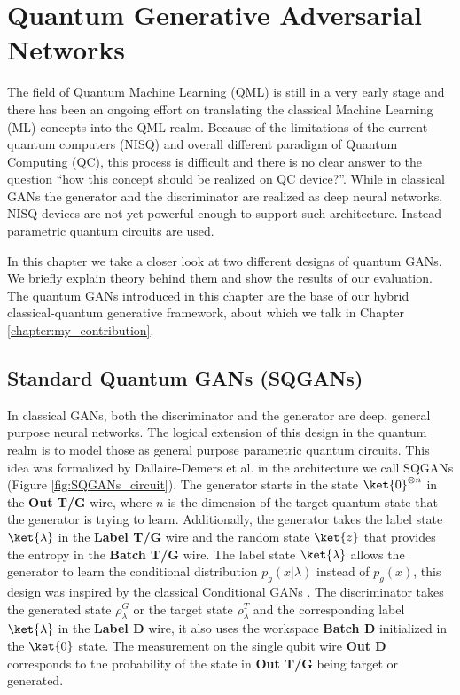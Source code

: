 \chapter{Quantum Generative Adversarial Networks}\label{chapter:quantum_gans}
The field of Quantum Machine Learning (QML) is still in a very early stage and there
has been an ongoing effort on translating the classical Machine Learning (ML)
concepts into the QML realm. Because of the limitations of the current quantum computers
(NISQ) \cite{bharti2021noisy} and overall different paradigm of Quantum
Computing (QC), this process is difficult and there is no clear
answer to the question ``how this concept should be realized on QC device?''.
While in classical GANs the generator and the discriminator are realized as deep neural
networks, NISQ devices are not yet powerful enough to support such architecture.
Instead parametric quantum circuits \cite{Schuld_2020} are used.

In this chapter we take a closer look at two different designs of quantum GANs.
We briefly explain theory behind them and show the results of our evaluation.
The quantum GANs introduced in this chapter are the base of our hybrid
classical-quantum generative framework, about which we talk in Chapter \ref{chapter:my_contribution}.

\section{Standard Quantum GANs (SQGANs)}
In classical GANs, both the discriminator and the generator are deep, general
purpose neural networks. The logical extension of this design in the quantum
realm is to model those as general purpose parametric quantum circuits. This
idea was formalized by Dallaire-Demers et al. \cite{Dallaire_Demers_2018} in
the architecture we call SQGANs (Figure \ref{fig:SQGANs_circuit}). The generator
starts in the state $\ket{0}^{\otimes n}$ in the \textbf{Out T/G} wire, where
$n$ is the dimension of the target quantum state that the generator is trying to learn.
Additionally, the generator takes the label state $\ket{\lambda}$ in the
\textbf{Label T/G} wire and the random state $\ket{z}$ that provides the entropy in
the \textbf{Batch T/G} wire. The label state $\ket{\lambda}$ allows the
generator to learn the conditional distribution $p_g(x|\lambda)$ instead of $p_g(x)$,
this design was inspired by the classical Conditional GANs
\cite{mirza2014conditional}. The discriminator takes the generated state
$\rho_\lambda^G$ or the target state $\rho_\lambda^T$ and the corresponding label
$\ket{\lambda}$ in the \textbf{Label D} wire, it also uses the workspace
\textbf{Batch D} initialized in the $\ket{0}$ state. The measurement on the single
qubit wire \textbf{Out D} corresponds to the probability of the state in 
\textbf{Out T/G} being target or generated.

